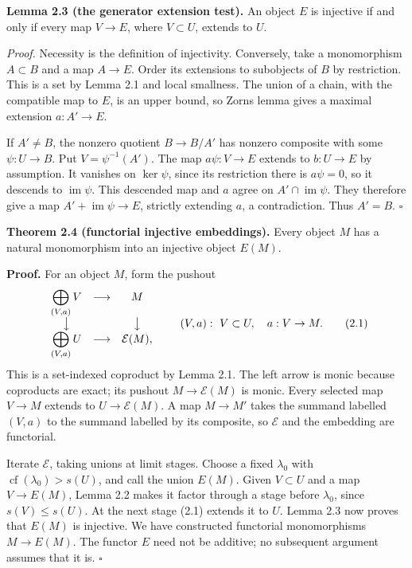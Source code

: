 \documentclass[
  english,
  11pt,
  a4paper,
]{article}
\begin{document}
\textbf{Lemma 2.3 (the generator extension test).} An object \(E\) is
injective if and only if every map \(V\to E\), where \(V\subset U\),
extends to \(U\).

\emph{Proof.} Necessity is the definition of injectivity. Conversely,
take a monomorphism \(A\subset B\) and a map \(A\to E\). Order its
extensions to subobjects of \(B\) by restriction. This is a set by Lemma
2.1 and local smallness. The union of a chain, with the compatible map
to \(E\), is an upper bound, so Zorn\textquotesingle s lemma gives a
maximal extension \(a:A'\to E\).

If \(A'\neq B\), the nonzero quotient \(B\to B/A'\) has nonzero
composite with some \(\psi:U\to B\). Put \(V=\psi^{-1}(A')\). The map
\(a\psi:V\to E\) extends to \(b:U\to E\) by assumption. It vanishes on
\(\ker\psi\), since its restriction there is \(a\psi=0\), so it descends
to \(\operatorname{im}\psi\). This descended map and \(a\) agree on
\(A'\cap\operatorname{im}\psi\). They therefore give a map
\(A'+\operatorname{im}\psi\to E\), strictly extending \(a\), a
contradiction. Thus \(A'=B\). \(\square\)

\textbf{Theorem 2.4 (functorial injective embeddings).} Every object
\(M\) has a natural monomorphism into an injective object \(E(M)\).

\textbf{Proof.} For an object \(M\), form the pushout
\[\begin{array}{ccc}
\displaystyle\bigoplus_{(V,a)}V&\longrightarrow&M\\
\big\downarrow&&\big\downarrow\\
\displaystyle\bigoplus_{(V,a)}U&\longrightarrow&\mathcal E(M),
\end{array}
\qquad
(V,a):\ V\subset U,\quad a:V\to M .
\tag{2.1}\] This is a set-indexed coproduct by Lemma 2.1. The left arrow
is monic because coproducts are exact; its pushout \(M\to\mathcal E(M)\)
is monic. Every selected map \(V\to M\) extends to
\(U\to\mathcal E(M)\). A map \(M\to M'\) takes the summand labelled
\((V,a)\) to the summand labelled by its composite, so \(\mathcal E\)
and the embedding are functorial.

Iterate \(\mathcal E\), taking unions at limit stages. Choose a fixed
\(\lambda_0\) with \(\operatorname{cf}(\lambda_0)>s(U)\), and call the
union \(E(M)\). Given \(V\subset U\) and a map \(V\to E(M)\), Lemma 2.2
makes it factor through a stage before \(\lambda_0\), since
\(s(V)\leq s(U)\). At the next stage (2.1) extends it to \(U\). Lemma
2.3 now proves that \(E(M)\) is injective. We have constructed
functorial monomorphisms \(M\to E(M)\). The functor \(E\) need not be
additive; no subsequent argument assumes that it is. \(\square\)
\end{document}
